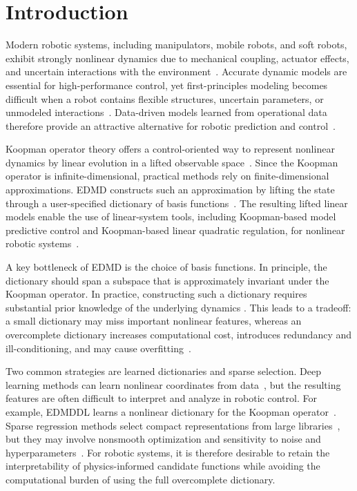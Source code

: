 \section{Introduction}
Modern robotic systems, including manipulators, mobile robots, and soft robots,
exhibit strongly nonlinear dynamics due to mechanical coupling, actuator
effects, and uncertain interactions with the environment~\cite{Brunton2022,DellaSantina2023}.
Accurate dynamic models are essential for high-performance control, yet
first-principles modeling becomes difficult when a robot contains flexible
structures, uncertain parameters, or unmodeled interactions~\cite{Mamakoukas2021TRO}.
Data-driven models learned from operational data therefore provide an attractive
alternative for robotic prediction and control~\cite{Brunke2022,Tang2025survey,LiSu2026TCST,LiEtAl2026TCYB}.

Koopman operator theory offers a control-oriented way to
represent nonlinear dynamics by linear evolution in a lifted observable
space~\cite{Koopman1931,Korda2018conv}. Since the Koopman operator is
infinite-dimensional, practical methods rely on finite-dimensional
approximations. EDMD constructs such an
approximation by lifting the state through a user-specified dictionary of basis
functions~\cite{Williams2015EDMD,Korda2018conv}. The resulting lifted linear
models enable the use of linear-system tools, including Koopman-based model
predictive control and Koopman-based linear quadratic regulation, for nonlinear
robotic systems~\cite{Proctor2016DMDc,Korda2018MPC,Brunton2016Koopman}.

A key bottleneck of EDMD is the choice of basis functions.
In principle, the dictionary should span a subspace that is approximately
invariant under the Koopman operator. In practice, constructing such a
dictionary requires substantial prior knowledge of the underlying dynamics
\cite{Mauroy2019}. This leads to a tradeoff: a small dictionary may miss
important nonlinear features, whereas an overcomplete dictionary increases
computational cost, introduces redundancy and ill-conditioning, and may cause
overfitting~\cite{Mamakoukas2021TRO,ShiKarydis2022RAL}.

Two common strategies are learned dictionaries and sparse selection. Deep
learning methods can learn nonlinear coordinates from
data~\cite{Lusch2018,ShiMeng2022RAL,Ren2023TMech}, but the resulting features
are often difficult to interpret and analyze in robotic control. For example,
EDMDDL learns a
nonlinear dictionary for the Koopman operator~\cite{Li2017}. Sparse regression
methods select compact representations from large libraries~\cite{Zhang2022Automatica},
but they may involve nonsmooth optimization and sensitivity to noise and
hyperparameters~\cite{WangEtAl2023RAL}. For robotic systems, it is therefore
desirable to retain the interpretability of physics-informed candidate functions
while avoiding the computational burden of using the full overcomplete
dictionary.

